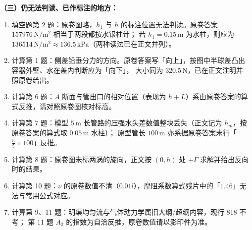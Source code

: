 \begin{tishi}
\textbf{（三）仍无法判读、已作标注的地方：}
\begin{enumerate}
  \item 填空题第 2 题：原卷图略，$h_1$ 与 $h$ 的标注位置无法判读。原卷答案 $157976\,\mathrm{N/m^2}$ 相当于两段都按水银柱计；
    若 $h_1=0.15\,\mathrm{m}$ 为水柱，则应为 $136514\,\mathrm{N/m^2}\approx136.5\,\mathrm{kPa}$（两种读法已在正文并列）。
  \item 计算第 1 题：侧盖铅垂分力的方向。原卷答案写「向上」，按图中半球盖凸出容器外壁、水在盖内判断应为「向下」，
    大小同为 $320.5\,\mathrm{N}$，已在正文注明并照原卷给出。
  \item 计算第 6 题：$A$ 断面与管出口的相对位置（表现为 $h+L$）系由原卷答案的算式反推，请对照原卷图核对标高。
  \item 计算第 7 题：模型 $5\,\mathrm{m}$ 长管路的压强水头差数值整块丢失（正文记为 $h_m$，按原卷答案的算式取 $0.05\,\mathrm{m}$ 水柱）；
    原型管长 $100\,\mathrm{m}$ 亦系据原卷答案末行「$\frac55\times100$」反推。
  \item 计算第 8 题：原卷图未标两涡的旋向，正文按 $(0,h)$ 处 $+\Gamma$ 求解并给出反向时的结果。
  \item 计算第 10 题：$\nu$ 的原卷数值不清（$0.01l$），摩阻系数算式残片中的「$1.46$」无法与常用公式对应。
  \item 计算第 9、11 题：明渠均匀流与气体动力学属旧大纲/超纲内容，现行 818 不考；
    第 11 题 $A_2$ 的指数为自洽反推，原卷数值请以影印件为准。
\end{enumerate}
\end{tishi}

